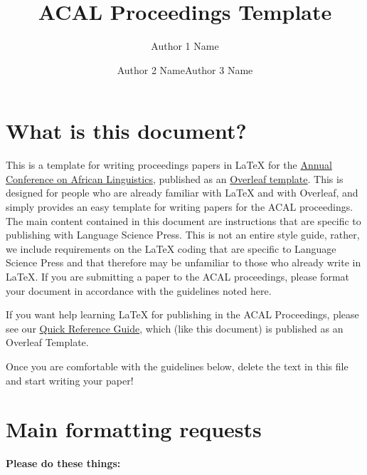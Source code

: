 \documentclass[output=paper,colorlinks,citecolor=brown,
]{langscibook}
\author{Author 1 Name\affiliation{Author 1 Affiliation}\and Author 2 Name\affiliation{Author 2 Affiliation}\lastand  Author 3 Name\affiliation{Author 3 Affiliation}}
\title{ACAL Proceedings Template}
\begin{document}
\maketitle

\section{What is this document?}

This is a template for writing proceedings papers in \LaTeX{} for the \href{https://acal.linguistlist.org}{Annual Conference on African Linguistics}, published as an \href{https://www.overleaf.com/latex/templates/acal-proceedings-template/kxmngmsjvfqq}{Overleaf template}. This is designed for people who are already familiar with \LaTeX{} and with Overleaf, and simply provides an easy template for writing papers for the ACAL proceedings. The main content contained in this document are  instructions that are specific to publishing with Language Science Press. This is not an entire style guide, rather, we include requirements on the \LaTeX{} coding that are specific to Language Science Press and that therefore may be unfamiliar to those who already write in \LaTeX{}. If you are submitting a paper to the ACAL proceedings, please format your document in accordance with the guidelines noted here. 

If you want help learning \LaTeX{} for publishing in the ACAL Proceedings, please see our \href{https://www.overleaf.com/latex/templates/acal-proceedings-latex-quick-reference-guide/fncrcrtgnxhv}{Quick Reference Guide}, which (like this document) is published as an Overleaf Template.

Once you are comfortable with the guidelines below, delete the text in this file and start writing your paper!

\section{Main formatting requests}

\textbf{Please do these things:}
\end{document}
